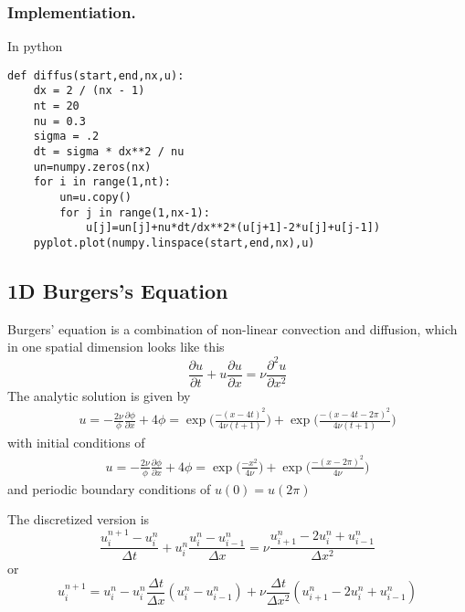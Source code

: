 \documentclass[../../../main.tex]{subfiles}
\begin{document}
\subsubsection*{Implementiation.}
In python
\begin{verbatim}
def diffus(start,end,nx,u):
    dx = 2 / (nx - 1)
    nt = 20    
    nu = 0.3   
    sigma = .2 
    dt = sigma * dx**2 / nu 
    un=numpy.zeros(nx)
    for i in range(1,nt):
        un=u.copy()
        for j in range(1,nx-1):
            u[j]=un[j]+nu*dt/dx**2*(u[j+1]-2*u[j]+u[j-1])
    pyplot.plot(numpy.linspace(start,end,nx),u)
\end{verbatim}

\subsection{1D Burgers's Equation}
Burgers' equation is a combination of non-linear convection and diffusion, which in one spatial dimension looks like this
\begin{equation*}
    \frac{\partial u}{\partial t} + u \frac{\partial u}{\partial x} = \nu \frac{\partial ^2u}{\partial x^2}
\end{equation*}
The analytic solution is given by 
\begin{gather*}
    u= -\frac{2 \nu}{\phi} \frac{\partial \phi}{\partial x} + 4 
    \phi = \exp \bigg(\frac{-(x-4t)^2}{4 \nu (t+1)} \bigg) + \exp \bigg(\frac{-(x-4t -2 \pi)^2}{4 \nu(t+1)} \bigg)
\end{gather*}
with initial conditions of 
\begin{gather*}
    u = -\frac{2 \nu}{\phi} \frac{\partial \phi}{\partial x} + 4 
    \phi = \exp \bigg(\frac{-x^2}{4 \nu} \bigg) + \exp \bigg(\frac{-(x-2 \pi)^2}{4 \nu} \bigg)
\end{gather*}
and periodic boundary conditions of $u(0)=u(2\pi)$

The discretized version is 
\begin{equation*}
    \frac{u_i^{n+1}-u_i^n}{\Delta t} + u_i^n \frac{u_i^n - u_{i-1}^n}{\Delta x} = \nu \frac{u_{i+1}^n - 2u_i^n + u_{i-1}^n}{\Delta x^2}
\end{equation*}
or 
\begin{equation*}
    u_i^{n+1} = u_i^n - u_i^n \frac{\Delta t}{\Delta x} (u_i^n - u_{i-1}^n) + \nu \frac{\Delta t}{\Delta x^2}(u_{i+1}^n - 2u_i^n + u_{i-1}^n)
\end{equation*}
\end{document}
